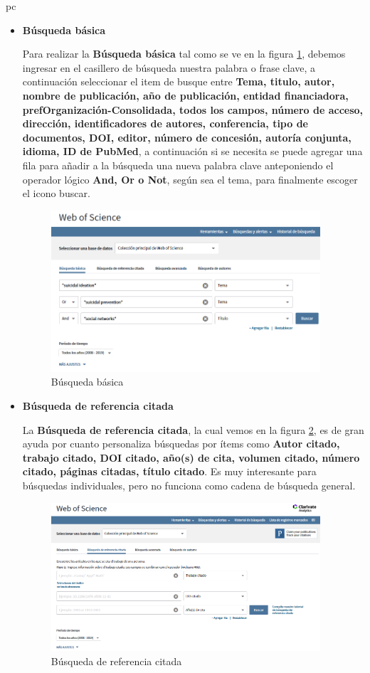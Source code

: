 pc\documentclass[a4paper,12pt,openany]{book}
\begin{document}
\begin{itemize}
\begin{itemize}
\item \textbf{Búsqueda básica}

Para realizar la \textbf{Búsqueda básica} tal como se ve en la figura \ref{fig:WOS3}, debemos ingresar en el casillero de búsqueda nuestra palabra o frase clave, a continuación seleccionar el item de busque entre \textbf{Tema, titulo, autor, nombre de publicación, año de publicación, entidad financiadora, prefOrganización-Consolidada, todos los campos, número de acceso, dirección, identificadores de autores, conferencia, tipo de documentos, DOI, editor, número de concesión, autoría conjunta, idioma, ID de PubMed}, a continuación si se necesita se puede agregar una fila para añadir a la búsqueda una nueva palabra clave anteponiendo el operador lógico \textbf{And, Or o Not}, según sea el tema, para finalmente escoger el icono buscar. 

    \begin{figure}[H]
    \centering
    \includegraphics[width=10cm]{Wos3.png}
    \caption{Búsqueda básica}
    \label{fig:WOS3}
    \end{figure}

\item \textbf{Búsqueda de referencia citada}

La \textbf{Búsqueda de referencia citada}, la cual vemos en la figura \ref{fig:WOS4}, es de gran ayuda por cuanto personaliza búsquedas por ítems como \textbf{Autor citado, trabajo citado, DOI citado, año(s) de cita, volumen citado, número citado, páginas citadas, título citado}. Es muy interesante para búsquedas individuales, pero no funciona como cadena de búsqueda general.

    \begin{figure}[H]
    \centering
    \includegraphics[width=10cm]{Wos4.png}
    \caption{Búsqueda de referencia citada}
    \label{fig:WOS4}
    \end{figure}



\end{itemize}
\end{itemize}
\end{document}
